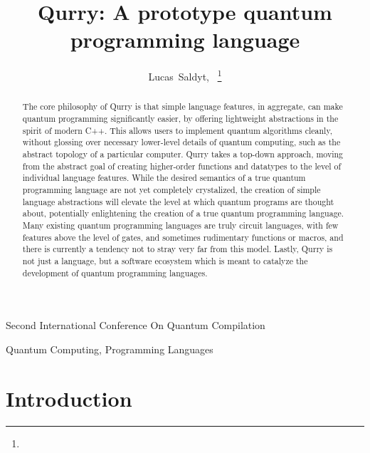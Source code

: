 \documentclass[journal]{IEEEtran}
\begin{document}
\title{Qurry: A prototype quantum programming language}

\author{Lucas~Saldyt,~
\thanks{}}

%
{Second International Conference On Quantum Compilation}

\maketitle

\begin{abstract}
    The core philosophy of Qurry is that simple language features, in aggregate, can make quantum programming significantly easier, by offering lightweight abstractions in the spirit of modern C++.
    This allows users to implement quantum algorithms cleanly, without glossing over necessary lower-level details of quantum computing, such as the abstract topology of a particular computer.
    Qurry takes a top-down approach, moving from the abstract goal of creating higher-order functions and datatypes to the level of individual language features.
    While the desired semantics of a true quantum programming language are not yet completely crystalized, the creation of simple language abstractions will elevate the level at which quantum programs are thought about, potentially enlightening the creation of a true quantum programming language.
    Many existing quantum programming languages are truly circuit languages, with few features above the level of gates, and sometimes rudimentary functions or macros, and there is currently a tendency not to stray very far from this model.
    Lastly, Qurry is not just a language, but a software ecosystem which is meant to catalyze the development of quantum programming languages.
\end{abstract}

\begin{IEEEkeywords}
    Quantum Computing, Programming Languages
\end{IEEEkeywords}

\IEEEpeerreviewmaketitle

\section{Introduction}
\end{document}
